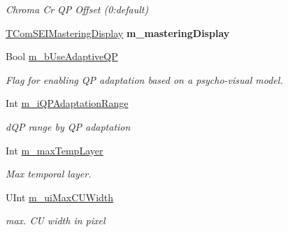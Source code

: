 \begin{DoxyCompactItemize}
\begin{DoxyCompactList}\small\item\em Chroma Cr QP Offset (0\+:default) \end{DoxyCompactList}\item 
\mbox{\label{class_t_app_enc_cfg_aabfa4164f83c743f074a0393966bc9dd}} 
\hyperlink{struct_t_com_s_e_i_mastering_display}{T\+Com\+S\+E\+I\+Mastering\+Display} {\bfseries m\+\_\+mastering\+Display}
\item 
\mbox{\label{class_t_app_enc_cfg_a31838a44159f1751687eab860db36aba}} 
Bool \hyperlink{class_t_app_enc_cfg_a31838a44159f1751687eab860db36aba}{m\+\_\+b\+Use\+Adaptive\+QP}
\begin{DoxyCompactList}\small\item\em Flag for enabling QP adaptation based on a psycho-\/visual model. \end{DoxyCompactList}\item 
\mbox{\label{class_t_app_enc_cfg_a4f25a69b50bbeb83005606d61ad928f3}} 
Int \hyperlink{class_t_app_enc_cfg_a4f25a69b50bbeb83005606d61ad928f3}{m\+\_\+i\+Q\+P\+Adaptation\+Range}
\begin{DoxyCompactList}\small\item\em d\+QP range by QP adaptation \end{DoxyCompactList}\item 
\mbox{\label{class_t_app_enc_cfg_a731071e8f1a2b7419b31e9ef6995e836}} 
Int \hyperlink{class_t_app_enc_cfg_a731071e8f1a2b7419b31e9ef6995e836}{m\+\_\+max\+Temp\+Layer}
\begin{DoxyCompactList}\small\item\em Max temporal layer. \end{DoxyCompactList}\item 
\mbox{\label{class_t_app_enc_cfg_a337b9ead924d8fa6d2b045dbfbbdc635}} 
U\+Int \hyperlink{class_t_app_enc_cfg_a337b9ead924d8fa6d2b045dbfbbdc635}{m\+\_\+ui\+Max\+C\+U\+Width}
\begin{DoxyCompactList}\small\item\em max. CU width in pixel \end{DoxyCompactList}\item 
\mbox{\label{class_t_app_enc_cfg_ac409a2465a2301a4df4786f434e912bb}} 

\end{DoxyCompactItemize}
